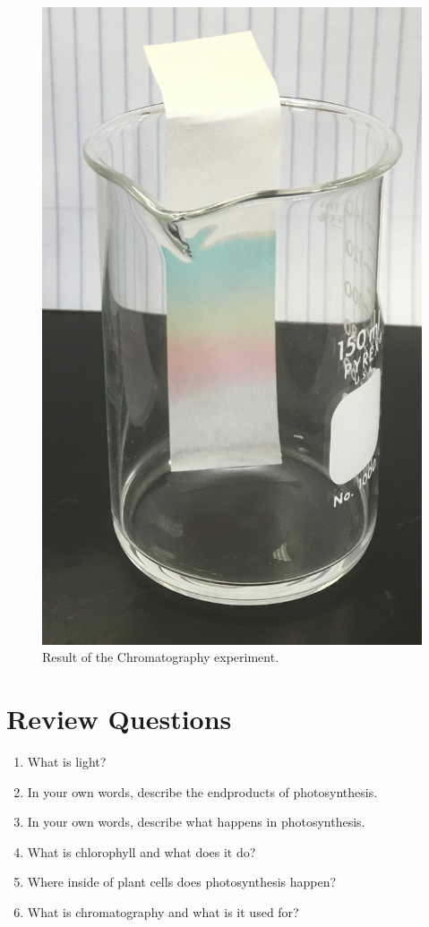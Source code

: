 \begin{figure}

{\centering \includegraphics[width=0.7\linewidth]{./figures/photosynthesis/chromatography}

}

\caption{Result of the Chromatography experiment.}\label{fig:chromatography}
\end{figure}

\section{Review Questions}\label{review-questions-5}

\begin{enumerate}
\def\labelenumi{\arabic{enumi}.}
\tightlist
\item
  What is light?
\item
  In your own words, describe the endproducts of photosynthesis.
\item
  In your own words, describe what happens in photosynthesis.
\item
  What is chlorophyll and what does it do?
\item
  Where inside of plant cells does photosynthesis happen?
\item
  What is chromatography and what is it used for?
\end{enumerate}
